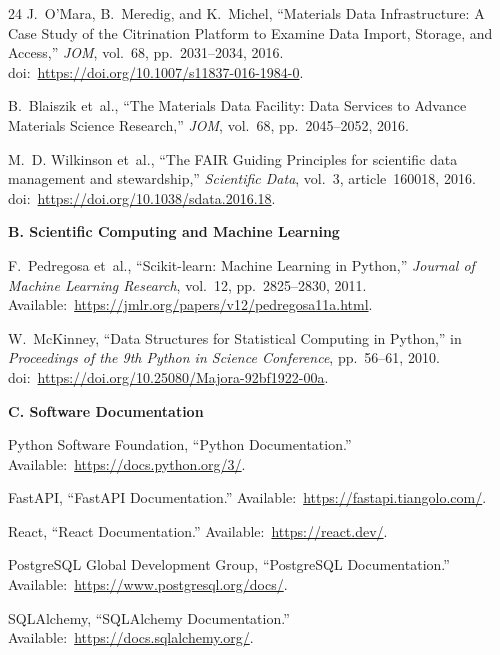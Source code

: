 \documentclass[12pt,a4paper,oneside]{report}
\begin{document}
{{{\begin{thebibliography}{24}
J.~O'Mara, B.~Meredig, and K.~Michel, ``Materials Data Infrastructure: A Case Study of the Citrination Platform to Examine Data Import, Storage, and Access,'' \textit{JOM}, vol.~68, pp.~2031--2034, 2016. doi:~\url{https://doi.org/10.1007/s11837-016-1984-0}.

B.~Blaiszik et~al., ``The Materials Data Facility: Data Services to Advance Materials Science Research,'' \textit{JOM}, vol.~68, pp.~2045--2052, 2016.

M.~D. Wilkinson et~al., ``The FAIR Guiding Principles for scientific data management and stewardship,'' \textit{Scientific Data}, vol.~3, article~160018, 2016. doi:~\url{https://doi.org/10.1038/sdata.2016.18}.

\item[] \vspace{0.4cm}\hspace{-\leftmargin}\textbf{\large B. Scientific Computing and Machine Learning}\vspace{0.2cm}

F.~Pedregosa et~al., ``Scikit-learn: Machine Learning in Python,'' \textit{Journal of Machine Learning Research}, vol.~12, pp.~2825--2830, 2011. Available:~\url{https://jmlr.org/papers/v12/pedregosa11a.html}.

W.~McKinney, ``Data Structures for Statistical Computing in Python,'' in \textit{Proceedings of the 9th Python in Science Conference}, pp.~56--61, 2010. doi:~\url{https://doi.org/10.25080/Majora-92bf1922-00a}.

\item[] \vspace{0.4cm}\hspace{-\leftmargin}\textbf{\large C. Software Documentation}\vspace{0.2cm}

Python Software Foundation, ``Python Documentation.'' Available:~\url{https://docs.python.org/3/}.

FastAPI, ``FastAPI Documentation.'' Available:~\url{https://fastapi.tiangolo.com/}.

React, ``React Documentation.'' Available:~\url{https://react.dev/}.

PostgreSQL Global Development Group, ``PostgreSQL Documentation.'' Available:~\url{https://www.postgresql.org/docs/}.

SQLAlchemy, ``SQLAlchemy Documentation.'' Available:~\url{https://docs.sqlalchemy.org/}.


\end{thebibliography}}}}
\end{document}
